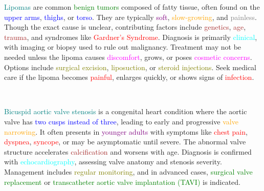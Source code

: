 \documentclass{article}
\begin{document}
\textcolor{teal}{Lipomas} are common \textcolor{green}{benign tumors} composed of fatty tissue, often found on the \textcolor{blue}{upper arms}, \textcolor{blue}{thighs}, or \textcolor{blue}{torso}. They are typically \textcolor{purple}{soft}, \textcolor{orange}{slow-growing}, and \textcolor{gray}{painless}. Though the exact cause is unclear, contributing factors include \textcolor{brown}{genetics}, \textcolor{brown}{age}, \textcolor{brown}{trauma}, and syndromes like \textcolor{red}{Gardner’s Syndrome}. Diagnosis is primarily \textcolor{cyan}{clinical}, with imaging or biopsy used to rule out malignancy. Treatment may not be needed unless the lipoma causes \textcolor{magenta}{discomfort}, grows, or poses \textcolor{magenta}{cosmetic concerns}. Options include \textcolor{olive}{surgical excision}, \textcolor{olive}{liposuction}, or \textcolor{olive}{steroid injections}. Seek medical care if the lipoma becomes \textcolor{red}{painful}, enlarges quickly, or shows signs of \textcolor{red}{infection}.

\\
\bigskip

\textcolor{teal}{Bicuspid aortic valve stenosis} is a congenital heart condition where the aortic valve has \textcolor{blue}{two cusps instead of three}, leading to early and progressive \textcolor{orange}{valve narrowing}. It often presents in \textcolor{purple}{younger adults} with symptoms like \textcolor{red}{chest pain}, \textcolor{red}{dyspnea}, \textcolor{red}{syncope}, or may be asymptomatic until severe. The abnormal valve structure accelerates \textcolor{brown}{calcification} and worsens with age. Diagnosis is confirmed with \textcolor{cyan}{echocardiography}, assessing valve anatomy and stenosis severity. Management includes \textcolor{olive}{regular monitoring}, and in advanced cases, \textcolor{green}{surgical valve replacement} or \textcolor{green}{transcatheter aortic valve implantation (TAVI)} is indicated.
\end{document}
